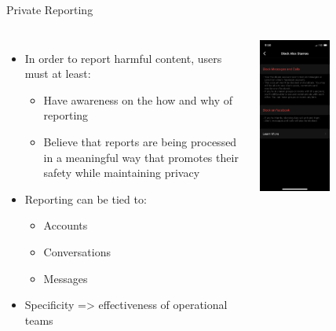 \documentclass[nobackground,dvipsnames,table,aspectratio=169]{beamer}
\begin{document}
\begin{frame}{Private Reporting}
    \begin{columns}
            \begin{itemize}
                \item In order to report harmful content, users must at least: 
                \begin{itemize}
                    \item Have awareness on the how and why of reporting
                    \item Believe that reports are being processed in a meaningful way that promotes their safety while maintaining privacy
                \end{itemize}
                \item Reporting can be tied to: 
                \begin{itemize}
                    \item Accounts
                    \item Conversations
                    \item Messages
                \end{itemize}
                \item Specificity => effectiveness of operational teams
            \end{itemize}
            \includegraphics[width=0.49\textwidth]{block-alex-stamos-2}

\end{columns}
\end{frame}
\end{document}
